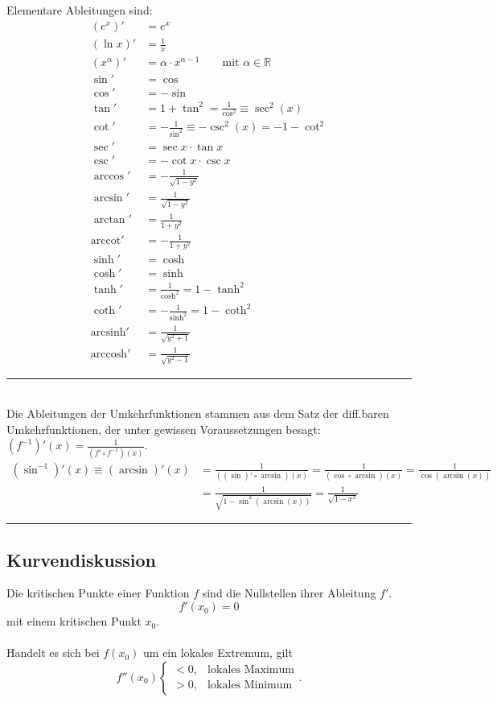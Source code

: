 \documentclass{article}
\begin{document}
\newpage


Elementare Ableitungen sind:
	\begin{align}
		(e^x)' &= e^x\\
		(\ln x)' &= \frac{1}{x}\\
		(x^\alpha)' &= \alpha \cdot x^{\alpha - 1} \qquad\text{mit $\alpha\in\mathbb{R}$}\\
		\sin' &= \cos\\
		\cos' &= -\sin\\
		\tan' &= 1 + \tan^2 = \frac{1}{\cos^2} \equiv \sec^2(x)\\
		\cot' &= -\frac{1}{\sin^2} \equiv -\csc^2(x)= -1 - \cot^2\\
		\sec' &= \sec x \cdot \tan x\\
		\csc' &= -\cot x \cdot \csc x\\
		\arccos' &= -\frac{1}{\sqrt{1 - y^2}}\\
		\arcsin' &= \frac{1}{\sqrt{1 - y^2}}\\
		\arctan' &= \frac{1}{1 + y^2}\\
		\text{arccot}' &= -\frac{1}{1 + y^2}\\
		\sinh' &= \cosh\\
		\cosh' &= \sinh\\
		\tanh' &= \frac{1}{\cosh^2} = 1 - \tanh^2\\
		\coth' &= -\frac{1}{\sinh^2} = 1 - \coth^2\\
		\text{arcsinh}' &= \frac{1}{\sqrt{y^2 + 1}}\\
		\text{arccosh}' &= \frac{1}{\sqrt{y^2 - 1}}
	\end{align}


{\color{violet}
\hrule
	\\
	Die Ableitungen der Umkehrfunktionen stammen aus dem Satz der diff.baren Umkehrfunktionen, der unter gewissen Voraussetzungen besagt: $(f^{-1})'(x) = \frac{1}{(f'\circ f^{-1})(x)}$.
		\begin{align*}
			(\sin^{-1})'(x) \equiv (\arcsin)'(x) &= \frac{1}{((\sin)'\circ \arcsin)(x)} = \frac{1}{(\cos\circ \arcsin)(x)} = \frac{1}{\cos(\arcsin(x))}\\
		 &= \frac{1}{\sqrt{1 - \sin^2(\arcsin(x))}} = \frac{1}{\sqrt{1 - x^2}}
		\end{align*}
\hrule
}


\newpage


\subsection{Kurvendiskussion}
Die kritischen Punkte einer Funktion $f$ sind die Nullstellen ihrer Ableitung $f'$.
	\begin{equation}
		f'(x_0) = 0
	\end{equation}
mit einem kritischen Punkt $x_0$.\\
\\
Handelt es sich bei $f(x_0)$ um ein lokales Extremum, gilt
	\begin{equation}
		f''(x_0) \begin{cases}< 0, & \text{lokales Maximum} \\ > 0, & \text{lokales Minimum}\end{cases}.
	\end{equation}
\end{document}
